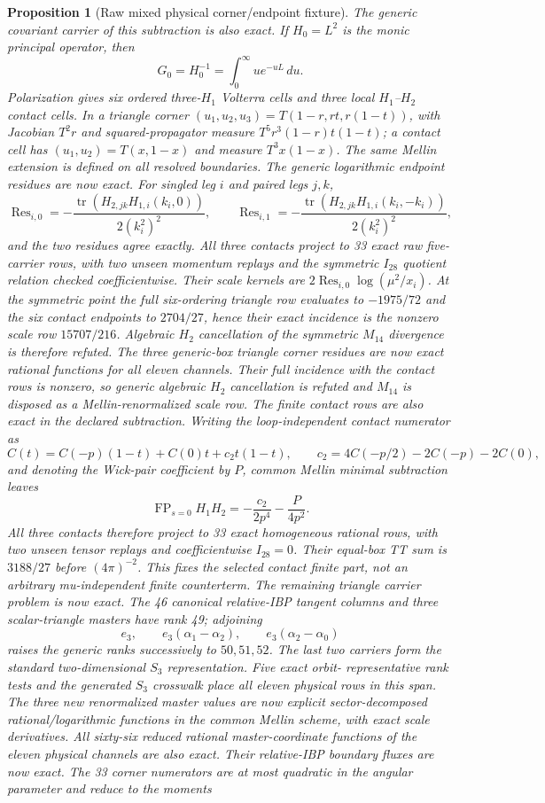 \documentclass[11pt]{article}
\newtheorem{proposition}[theorem]{Proposition}
\theoremstyle{definition}
\theoremstyle{remark}
\begin{document}
\begin{proposition}[Raw mixed physical corner/endpoint fixture]
The generic covariant carrier of this subtraction is also exact.  If
$H_0=L^2$ is the monic principal operator, then
\[
 G_0=H_0^{-1}=\int_0^\infty u e^{-uL}\,du.
\]
Polarization gives six ordered three-$H_1$ Volterra cells and three local
$H_1$--$H_2$ contact cells.  In a triangle corner
$(u_1,u_2,u_3)=T(1-r,rt,r(1-t))$, with Jacobian $T^2r$ and squared-propagator
measure $T^5r^3(1-r)t(1-t)$; a contact cell has
$(u_1,u_2)=T(x,1-x)$ and measure $T^3x(1-x)$.  The same Mellin extension is
defined on all resolved boundaries.  The generic logarithmic endpoint
residues are now exact.  For singled leg $i$ and paired legs $j,k$,
\[
 \operatorname{Res}_{i,0}=-\frac{\operatorname{tr}(H_{2,jk}H_{1,i}(k_i,0))}{2(k_i^2)^2},
 \qquad
 \operatorname{Res}_{i,1}=-\frac{\operatorname{tr}(H_{2,jk}H_{1,i}(k_i,-k_i))}{2(k_i^2)^2},
\]
and the two residues agree exactly.  All three contacts project to 33 exact
raw five-carrier rows, with two unseen momentum replays and the symmetric
$I_{28}$ quotient relation checked coefficientwise.  Their scale kernels are
$2\operatorname{Res}_{i,0}\log(\mu^2/x_i)$.  At the symmetric point the full
six-ordering triangle row evaluates to $-1975/72$ and the six contact
endpoints to $2704/27$, hence their exact incidence is the nonzero scale row
$15707/216$.  Algebraic $H_2$ cancellation of the symmetric $M_{14}$
divergence is therefore refuted.  The three generic-box triangle corner
residues are now exact rational functions for all eleven channels.  Their
full incidence with the contact rows is nonzero, so generic algebraic $H_2$
cancellation is refuted and $M_{14}$ is disposed as a Mellin-renormalized
scale row.  The finite contact rows are also exact in the declared subtraction.
Writing the loop-independent contact numerator as
\[
 C(t)=C(-p)(1-t)+C(0)t+c_2t(1-t),
 \qquad
 c_2=4C(-p/2)-2C(-p)-2C(0),
\]
and denoting the Wick-pair coefficient by $P$, common Mellin minimal
subtraction leaves
\[
 \operatorname{FP}_{s=0}H_1H_2
 =-\frac{c_2}{2p^4}-\frac{P}{4p^2}.
\]
All three contacts therefore project to 33 exact homogeneous rational rows,
with two unseen tensor replays and coefficientwise $I_{28}=0$.  Their
equal-box TT sum is $3188/27$ before $(4\pi)^{-2}$.  This fixes the selected
contact finite part, not an arbitrary mu-independent finite counterterm.  The
remaining triangle carrier problem is now exact.  The 46 canonical
relative-IBP tangent columns and three scalar-triangle masters have rank 49;
adjoining
\[
 e_3,\qquad e_3(\alpha_1-\alpha_2),\qquad
 e_3(\alpha_2-\alpha_0)
\]
raises the generic ranks successively to $50,51,52$.  The last two carriers
form the standard two-dimensional $S_3$ representation.  Five exact orbit-
representative rank tests and the generated $S_3$ crosswalk place all eleven
physical rows in this span.  The three new renormalized master values are now
explicit sector-decomposed rational/logarithmic functions in the common
Mellin scheme, with exact scale derivatives.  All sixty-six reduced rational
master-coordinate functions of the eleven physical channels are also exact.
Their relative-IBP boundary fluxes are now exact.  The 33 corner numerators
are at most quadratic in the angular parameter and reduce to the moments


\end{proposition}
\end{document}
